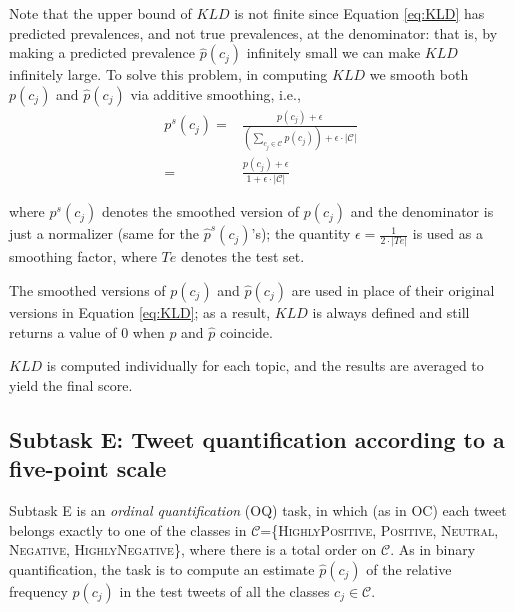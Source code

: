 \documentclass[11pt,letterpaper]{article}
\begin{document}
Note that the upper bound of $KLD$ is not finite since Equation
\ref{eq:KLD} has predicted prevalences, and not true prevalences, at
the denominator: that is, by making a predicted prevalence
$\hat{p}(c_{j})$ infinitely small we can make $KLD$ infinitely large.
To solve this problem, in computing $KLD$ we smooth both $p(c_{j})$
and $\hat{p}(c_{j})$ via additive smoothing, i.e.,
%
\begin{equation}
  \begin{aligned}
    \label{eq:smoothing}
    p^{s}(c_{j})= &
    \frac{p(c_{j})+\epsilon}{(\displaystyle\sum_{c_{j}\in
    \mathcal{C}}p(c_{j}))+\epsilon\cdot|\mathcal{C}|} \\ = &
    \frac{p(c_{j})+\epsilon}{1+\epsilon\cdot|\mathcal{C}|}
  \end{aligned}
\end{equation}

%
\noindent where $p^{s}(c_{j})$ denotes the smoothed version of
$p(c_{j})$ and the denominator is just a normalizer (same for
the $\hat{p}^{s}(c_{j})$'s); the quantity $\epsilon=\frac{1}{2\cdot
|Te|}$ is used as a smoothing factor, where $Te$ denotes the test set.

The smoothed versions of $p(c_{j})$ and $\hat{p}(c_{j})$ are used
in place of their original versions in Equation \ref{eq:KLD}; as a
result, $KLD$ is always defined and still returns a value of 0 when
$p$ and $\hat{p}$ coincide.

$KLD$ is computed individually for each topic, and the results are averaged %
to yield the final score.


\subsection{Subtask E: Tweet quantification according to a five-point
scale}
\label{sec:4E}

\noindent Subtask E is an \emph{ordinal quantification} (OQ) task, in
which (as in OC) each tweet belongs exactly to one of the classes in
$\mathcal{C}$=\{\textsc{HighlyPositive}, \textsc{Positive},
\textsc{Neutral}, \textsc{Negative}, \textsc{HighlyNegative}\}, where
there is a total order on $\mathcal{C}$. As in binary quantification,
the task is to compute an estimate $\hat{p}(c_{j})$ of the relative
frequency $p(c_{j})$ in the test tweets of all the classes $c_{j}\in
\mathcal{C}$.
\end{document}
